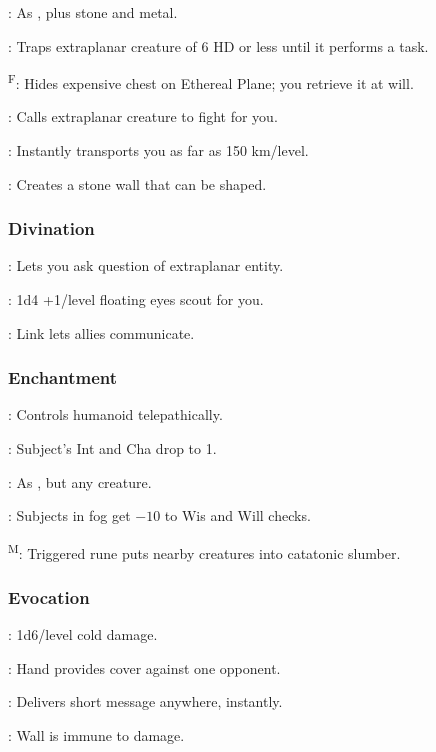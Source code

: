 	: As , plus stone and metal.

	: Traps extraplanar creature of 6 HD or less until it performs a task.

	\textsuperscript{F}: Hides expensive chest on Ethereal Plane; you retrieve it at will.

	: Calls extraplanar creature to fight for you.

	: Instantly transports you as far as 150 km/level.

	: Creates a stone wall that can be shaped.

\subsubsection{Divination}
	: Lets you ask question of extraplanar entity.

	: 1d4 +1/level floating eyes scout for you.

	: Link lets allies communicate.

\subsubsection{Enchantment}
	: Controls humanoid telepathically.

	: Subject's Int and Cha drop to 1.

	: As , but any creature.

	: Subjects in fog get $-10$ to Wis and Will checks.

	\textsuperscript{M}: Triggered rune puts nearby creatures into catatonic slumber.

\subsubsection{Evocation}
	: 1d6/level cold damage.

	: Hand provides cover against one opponent.

	: Delivers short message anywhere, instantly.

	: Wall is immune to damage.

